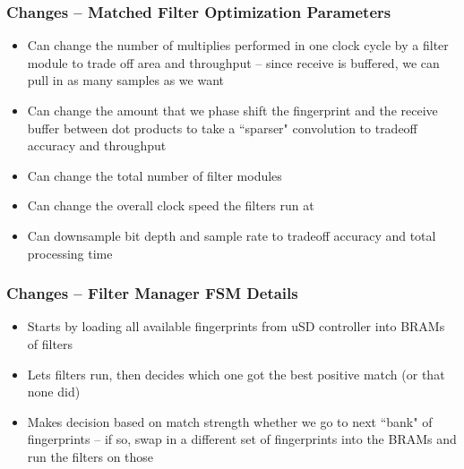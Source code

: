 \documentclass{beamer}
\begin{document}
    \begin{frame}
        \frametitle{Changes -- Matched Filter Optimization Parameters}

        \begin{itemize}
            \item Can change the number of multiplies performed in one clock cycle by a filter module to trade off area and throughput -- since receive is buffered, we can pull in as many samples as we want

            \item Can change the amount that we phase shift the fingerprint and the receive buffer between dot products to take a ``sparser" convolution to tradeoff accuracy and throughput

            \item Can change the total number of filter modules

            \item Can change the overall clock speed the filters run at

            \item Can downsample bit depth and sample rate to tradeoff accuracy and total processing time
        \end{itemize}
    \end{frame}

    \begin{frame}
        \frametitle{Changes -- Filter Manager FSM Details}

        \begin{itemize}
            \item Starts by loading all available fingerprints from uSD controller into BRAMs of filters

            \item Lets filters run, then decides which one got the best positive match (or that none did)

            \item Makes decision based on match strength whether we go to next ``bank" of fingerprints -- if so, swap in a different set of fingerprints into the BRAMs and run the filters on those
        \end{itemize}
    \end{frame}
\end{document}
